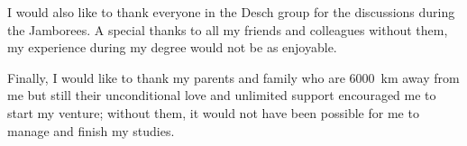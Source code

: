 I would also like to thank everyone in the Desch group for the discussions during the Jamborees. A special thanks to all my friends and colleagues without them, my experience during my degree would not be as enjoyable.

Finally, I would like to thank my parents and family who are \SI{6000}{\kilo\meter} away from me but still their unconditional love and unlimited support encouraged me to start my venture; without them, it would not have been possible for me to manage and finish my studies.


